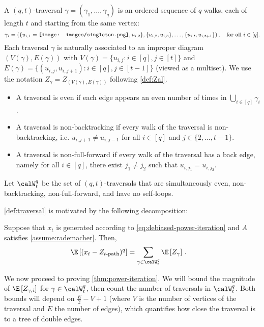 \documentclass[12pt]{article}
\newcommand{\rootpic}{\vcenter{\hbox{\texttt{[image: images/singleton.png]}}}}
\begin{document}
\begin{definition}\label{def:traversal}
    A $(q,t)$-traversal $\gamma=(\gamma_1,\ldots,\gamma_q)$ is an ordered sequence of $q$ walks, each of length $t$ and starting from the same vertex:
    \[
        \gamma_i = (\{u_{i,1}=\rootpic,u_{i,2}\},\{u_{i,2},u_{i,3}\},\ldots,\{u_{i,t},u_{i,t+1}\})\,,\quad\text{for all $i\in [q]$}.
    \]
    Each traversal $\gamma$ is naturally associated to an improper diagram $(V(\gamma),E(\gamma))$ with $V(\gamma) = \{u_{i,j}:i\in [q], j\in[t]\}$ and $E(\gamma)=\{(u_{i,j},u_{i,j+1}):i\in[q],j\in[t-1]\}$ (viewed as a multiset). We use the notation $Z_\gamma=Z_{(V(\gamma),E(\gamma))}$ following \cref{def:Zal}.
    
    \begin{itemize}
        \item A traversal is even if each edge appears an even number of times in $\bigcup_{i\in [q]} \gamma_i$.
        \item A traversal is non-backtracking if every walk of the traversal is non-backtracking, i.e. $u_{i,j+1}\neq u_{i,j-1}$ for all $i\in [q]$ and $j\in \{2,\ldots,t-1\}$.
        \item A traversal is non-full-forward if every walk of the traversal has a back edge, namely for all $i\in [q]$, there exist $j_1\neq j_2$ such that $u_{i,j_1}=u_{i,j_2}$.
    \end{itemize}

    Let $\calW_t^q$ be the set of $(q,t)$-traversals that are simultaneously even, non-backtracking, non-full-forward, and have no self-loops.
\end{definition}

\cref{def:traversal} is motivated by the following decomposition:

\begin{claim}\label{claim:walk-decomposition}
    Suppose that $x_t$ is generated according to \cref{eq:debiased-power-iteration} and $A$ satisfies \cref{assume:rademacher}. Then,
    \begin{align*}
        \E \left[(x_t-Z_{t\textnormal{-path}})^q\right] &= \sum_{\gamma\in\calW_t^q} \E \left[Z_\gamma\right]\,.
    \end{align*}
\end{claim}

We now proceed to proving \cref{thm:power-iteration}. We will bound the magnitude of $\E\left[Z_{\gamma,i}\right]$ for $\gamma\in\calW^q_t$, then count the number of traversals in $\calW^q_t$. Both bounds will depend on $\frac E 2 - V + 1$ (where $V$ is the number of vertices of the traversal and $E$ the number of edges), which quantifies how close the traversal is to a tree of double edges. 
\end{document}
